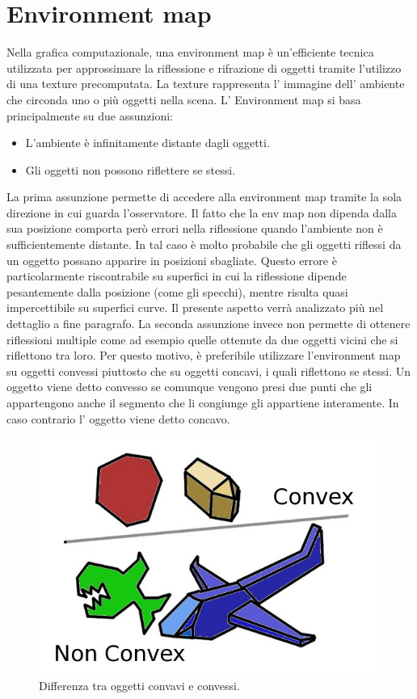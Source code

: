 \section{Environment map}
\label{sec:chapter_stato_arte_envmap}

Nella grafica computazionale, una environment map è un’efficiente tecnica utilizzata per approssimare la riflessione e rifrazione di oggetti tramite l’utilizzo di una texture precomputata.
La texture rappresenta l’ immagine dell’ ambiente che circonda uno o più oggetti nella scena.
L’ Environment map si basa principalmente su due assunzioni:
\begin{itemize}
\item L’ambiente è infinitamente distante dagli oggetti.
\item Gli oggetti non possono riflettere se stessi.
\end{itemize}

La prima assunzione permette di accedere alla environment map tramite la sola direzione in cui guarda l’osservatore. Il fatto che la env map non dipenda dalla sua posizione comporta però errori nella riflessione quando l’ambiente non è sufficientemente distante. In tal caso è molto probabile che gli oggetti riflessi da un oggetto possano apparire in posizioni sbagliate.
Questo errore è particolarmente riscontrabile su superfici in cui la riflessione dipende pesantemente dalla posizione (come gli specchi), mentre risulta quasi impercettibile su superfici curve. Il presente aspetto verrà analizzato più nel dettaglio a fine paragrafo.
La seconda assunzione invece non permette di ottenere riflessioni multiple come ad esempio quelle ottenute da due oggetti vicini che si riflettono tra loro. Per questo motivo, è preferibile utilizzare l’environment map su oggetti convessi piuttosto che su oggetti concavi, i quali riflettono se stessi.
Un oggetto viene detto convesso se comunque vengono presi due punti che gli appartengono anche il segmento che li congiunge gli appartiene interamente. In caso contrario l’ oggetto viene detto concavo.
\\
\begin{figure}[htb]
 \centering
 \includegraphics[width=0.5\linewidth]{images/chapter_stato_arte/stato_arte_conc_conv.jpg}\hfill
 \caption[Concavo,convesso]{Differenza tra oggetti convavi e convessi.}
 \label{fig:stato_arte_conc_conv}
\end{figure}

